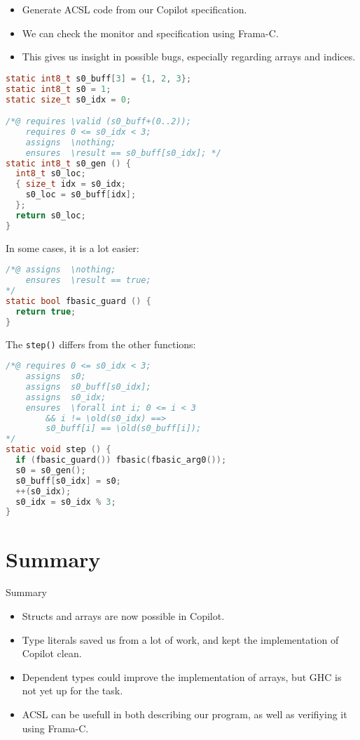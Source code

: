 \documentclass{beamer}
\begin{document}
\begin{frame}[fragile]
\begin{itemize}
  \item Generate ACSL code from our Copilot specification.
  \item We can check the monitor and specification using Frama-C.
  \item This gives us insight in possible bugs, especially regarding arrays and
  indices.
\end{itemize}

\begin{lstlisting}[language=c, basicstyle=\small]
static int8_t s0_buff[3] = {1, 2, 3};
static int8_t s0 = 1;
static size_t s0_idx = 0;

/*@ requires \valid (s0_buff+(0..2));
    requires 0 <= s0_idx < 3;
    assigns  \nothing;
    ensures  \result == s0_buff[s0_idx]; */
static int8_t s0_gen () {
  int8_t s0_loc;
  { size_t idx = s0_idx;
    s0_loc = s0_buff[idx];
  };
  return s0_loc;
}
\end{lstlisting}
\end{frame}

\begin{frame}[fragile]
In some cases, it is a lot easier:
\begin{lstlisting}[language=c]
/*@ assigns  \nothing;
    ensures  \result == true;
*/
static bool fbasic_guard () {
  return true;
}
\end{lstlisting}
\end{frame}

\begin{frame}[fragile]
The \texttt{step()} differs from the other functions:
\begin{lstlisting}[language=c, basicstyle=\small]
/*@ requires 0 <= s0_idx < 3;
    assigns  s0;
    assigns  s0_buff[s0_idx];
    assigns  s0_idx;
    ensures  \forall int i; 0 <= i < 3
        && i != \old(s0_idx) ==>
        s0_buff[i] == \old(s0_buff[i]);
*/
static void step () {
  if (fbasic_guard()) fbasic(fbasic_arg0());
  s0 = s0_gen();
  s0_buff[s0_idx] = s0;
  ++(s0_idx);
  s0_idx = s0_idx % 3;
}
\end{lstlisting}
\end{frame}



\section{Summary}
\begin{frame}{Summary}
\begin{itemize}
  \item Structs and arrays are now possible in Copilot.
  \item Type literals saved us from a lot of work, and kept the implementation
  of Copilot clean.
  \item Dependent types could improve the implementation of arrays, but GHC is
  not yet up for the task.
  \item ACSL can be usefull in both describing our program, as well as
  verifiying it using Frama-C.
\end{itemize}
\end{frame}
\end{document}
